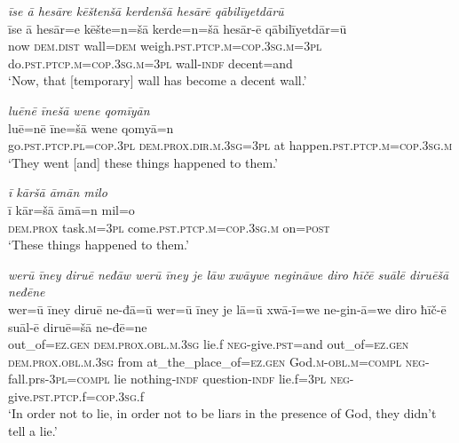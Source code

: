 \ea \label{BP.204}
\textit{īse ā hesāre kēštenšā kerdenšā hesārē qābilīyetdārū} \\ 
\gll īse ā hesār=e kēšte=n=šā kerde=n=šā hesār-ē qābilīyetdār=ū \\ 
 now \textsc{dem.dist} wall\textsc{=dem} weigh\textsc{.pst}\textsc{.ptcp}\textsc{.m}\textsc{=cop}\textsc{.3sg}\textsc{.m}\textsc{=3pl} do\textsc{.pst}\textsc{.ptcp}\textsc{.m}\textsc{=cop}\textsc{.3sg}\textsc{.m}\textsc{=3pl} wall\textsc{-indf} decent=and \\ 
\glt `Now, that [temporary] wall has become a decent wall.'
\z 
 
\ea \label{BP.209}
\textit{luēnē īnešā wene qomīyān} \\ 
\gll luē=nē īne=šā wene qomyā=n \\ 
 go\textsc{.pst}\textsc{.ptcp}\textsc{.pl}\textsc{=cop}\textsc{.3pl} \textsc{dem.prox}\textsc{.dir}\textsc{.m}\textsc{.3sg}\textsc{=3pl} at happen\textsc{.pst}\textsc{.ptcp}\textsc{.m}\textsc{=cop}\textsc{.3sg}\textsc{.m} \\ 
\glt `They went [and] these things happened to them.'
\z 
 
\ea \label{BP.210}
\textit{ī kāršā āmān milo} \\ 
\gll ī kār=šā āmā=n mil=o \\ 
 \textsc{dem.prox} task\textsc{.m}\textsc{=3pl} come\textsc{.pst}\textsc{.ptcp}\textsc{.m}\textsc{=cop}\textsc{.3sg}\textsc{.m} on\textsc{=\textsc{post}} \\ 
\glt `These things happened to them.'
\z 
 
\ea \label{BP.211}
\textit{werū īney diruē neđāw werū īney je lāw xwāywe negināwe diro ħīčē suālē diruēšā neđēne} \\ 
\gll wer=ū īney diruē ne-đā=ū wer=ū īney je lā=ū xwā-ī=we ne-gin-ā=we diro ħīč-ē suāl-ē diruē=šā ne-đē=ne \\ 
 out\_of\textsc{=ez.gen} \textsc{dem.prox}\textsc{.obl}\textsc{.m}\textsc{.3sg} lie.f \textsc{neg-}give\textsc{.pst}=and out\_of\textsc{=ez.gen} \textsc{dem.prox}\textsc{.obl}\textsc{.m}\textsc{.3sg} from at\_the\_place\_of\textsc{=ez.gen} God\textsc{.m}\textsc{-obl}\textsc{.m}\textsc{=compl} \textsc{neg-}fall.prs\textsc{-3pl}\textsc{=compl} lie nothing\textsc{-indf} question\textsc{-indf} lie.f\textsc{=3pl} \textsc{neg-}give\textsc{.pst}\textsc{.ptcp}.f\textsc{=cop}\textsc{.3sg}.f \\ 
\glt `In order not to lie, in order not to be liars in the presence of God, they didn’t tell a lie.'
\z 
 
